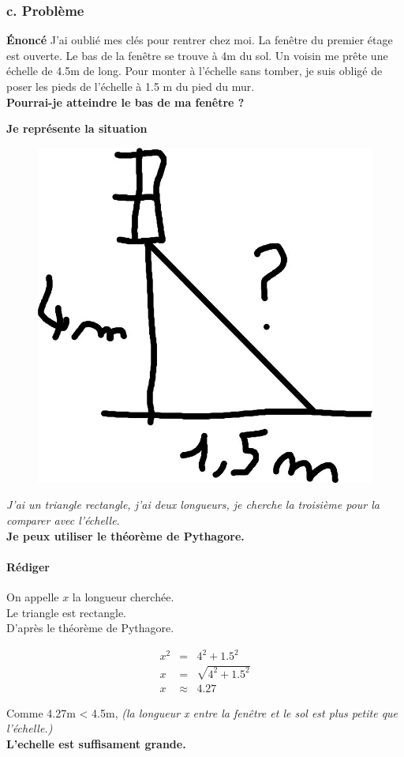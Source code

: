 \documentclass[12pt]{article}
\begin{document}
\newpage

\subsubsection*{c. Problème}

\textbf{Énoncé} J'ai oublié mes clés pour rentrer chez moi. La fenêtre du premier étage est ouverte.
Le bas de la fenêtre se trouve à 4m du sol. Un voisin me prête une échelle de 4.5m de long.
Pour monter à l'échelle sans tomber, je suis obligé de poser les pieds de l'échelle à 1.5 m du pied du mur.\\
\textbf{Pourrai-je atteindre le bas de ma fenêtre ?}

\begin{multicols}{2}

	\textbf{Je représente la situation}

	\begin{figure}[H]
		\centering
		\includegraphics[width=0.5\linewidth]{4x4-pythagore/sources/probleme.jpg}
	\end{figure}

	\textit{J'ai un triangle rectangle, j'ai deux longueurs, je cherche la troisième pour la comparer avec l'échelle.}\\
	\textbf{Je peux utiliser le théorème de Pythagore.}
	\vspace{1cm}
	\paragraph{Rédiger}
  On appelle $x$ la longueur cherchée.\\
	Le triangle est rectangle.\\
	D'après le théorème de Pythagore.

	\begin{eqnarray*}
		x^2 &=& 4^2 + 1.5^2 \\
		x   &=& \sqrt{4^2 + 1.5^2} \\
		x   &\approx& 4.27
	\end{eqnarray*}

	Comme 4.27m < 4.5m, \textit{(la longueur x entre la fenêtre et le sol est plus petite que l'échelle.)}\\
	\textbf{L'echelle est suffisament grande.}
\end{multicols}
\end{document}
